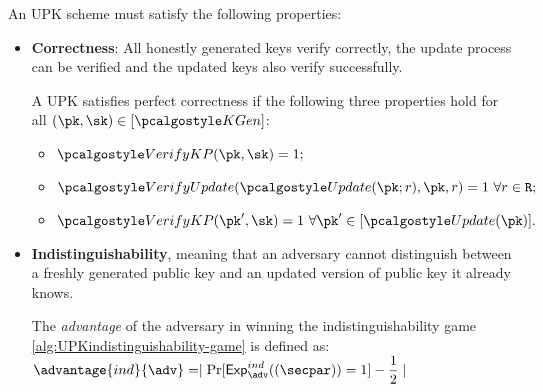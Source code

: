 An UPK scheme must satisfy the following properties:
\begin{itemize}
    \item \textbf{Correctness}: All honestly generated keys verify correctly, the update process can be verified and the updated keys also verify successfully.
    \begin{definition}\label{def:UPKCorrectness} 
        A UPK satisfies perfect correctness if the following three properties hold for all $(\pk, \sk) \in [\kgen]$:
        \begin{itemize}
            \item $\verkp(\pk,\sk) = 1;$
            \item $\verupd(\upd(\pk;r), \pk, r) = 1 \ \forall r  \in \rset;$
            \item $\verkp(\pk^\prime, \sk) = 1 \ \forall \pk^\prime \in [\upd(\pk)].$
        \end{itemize}
    \end{definition}
    \item \textbf{Indistinguishability}, meaning that an adversary cannot distinguish between a freshly generated public key and an updated version of public key it already knows.
    \begin{definition}\label{def:UPKindistinguishability} 
        The \emph{advantage} of the adversary in winning the indistinguishability game \ref{alg:UPKindistinguishability-game} is defined as:
        $
            \advantage{ind}{\adv} = \mid \Pr[\exper^{ind}_{\adv}((\secpar))=1] - \dfrac{1}{2} \mid
        $
    

\end{definition}
\end{itemize}
